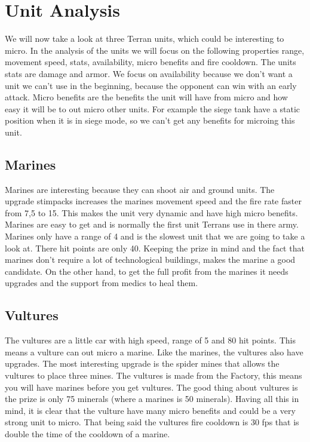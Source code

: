 \section{Unit Analysis}
We will now take a look at three Terran units, which could be interesting to micro. In the analysis of the units we will
focus on the following properties range, movement speed, stats, availability, micro benefits and fire cooldown. The units stats are damage
and armor. We focus on availability because we don't want a unit we can't use in the beginning, because the opponent can
win with an early attack. Micro benefits are the benefits the unit will have from micro and how easy it will be to out micro
other units. For example the siege tank have a static position when it is in siege mode, so we can't get any benefits for microing
this unit. 

\subsection{Marines}
Marines are interesting because they can shoot air and ground units. The upgrade stimpacks increases the marines movement speed and the fire rate
faster from 7,5 to 15. This makes the unit very dynamic and have high micro benefits. Marines are easy to get and is normally the first unit Terrans use in
there army. Marines only have a range of 4 and is the slowest unit that we are going to take a look at. There
hit points are only 40. Keeping the prize in mind and the fact that marines don't require a lot of
technological buildings, makes the marine a good candidate. On the other hand, to get the full profit from the
marines it needs upgrades and the support from medics to heal them. 

\subsection{Vultures}
The vultures are a little car with high speed, range of 5 and 80 hit points. This means a vulture can out micro a marine. Like the marines, the
vultures also have upgrades. The most interesting upgrade is the spider mines that allows the vultures to place three mines. The vultures is made
from the Factory, this means you will have marines before you get vultures. The good thing about vultures is the prize is only 75 minerals (where
a marines is 50 minerals). Having all this in mind, it is clear that the vulture have many micro benefits and could be a very strong unit to micro.
That being said the vultures fire cooldown is 30 fps that is double the time of the cooldown of a marine.

